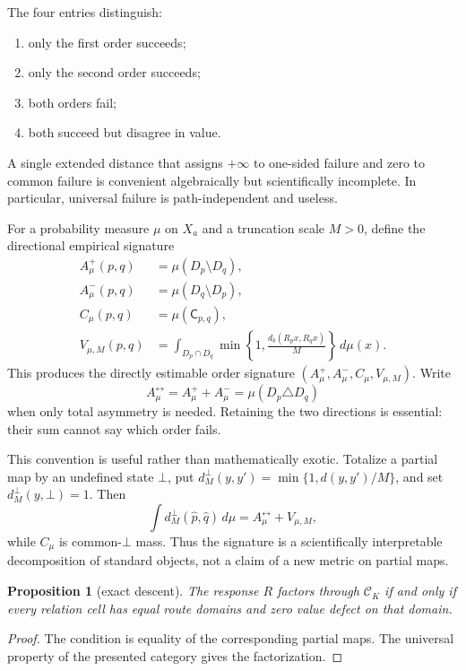 \documentclass[11pt]{article}
\newtheorem{proposition}[theorem]{Proposition}
\theoremstyle{definition}
\theoremstyle{remark}
\newcommand{\cK}{\mathcal{C}_K}
\newcommand{\cfail}{\mathsf{C}}
\begin{document}
The four entries distinguish:

\begin{enumerate}
  \item only the first order succeeds;
  \item only the second order succeeds;
  \item both orders fail;
  \item both succeed but disagree in value.
\end{enumerate}

A single extended distance that assigns \(+\infty\) to one-sided failure and
zero to common failure is convenient algebraically but scientifically
incomplete. In particular, universal failure is path-independent and useless.

For a probability measure \(\mu\) on \(X_a\) and a truncation scale \(M>0\),
define the directional empirical signature
\begin{align}
A_\mu^+(p,q)&=\mu(D_p\setminus D_q),\label{eq:asymplus}\\
A_\mu^-(p,q)&=\mu(D_q\setminus D_p),\label{eq:asymminus}\\
C_\mu(p,q)&=\mu(\cfail_{p,q}),\label{eq:common}\\
V_{\mu,M}(p,q)&=
\int_{D_p\cap D_q}
\min\left\{1,\frac{d_b(R_px,R_qx)}{M}\right\}\,d\mu(x).
\label{eq:value}
\end{align}
This produces the directly estimable order signature
\((A_\mu^+,A_\mu^-,C_\mu,V_{\mu,M})\). Write
\[
A_\mu^{\leftrightarrow}=A_\mu^++A_\mu^-
=\mu(D_p\triangle D_q)
\]
when only total asymmetry is needed. Retaining the two directions is
essential: their sum cannot say which order fails.

This convention is useful rather than mathematically exotic. Totalize a
partial map by an undefined state \(\bot\), put
\(d_M^\bot(y,y')=\min\{1,d(y,y')/M\}\), and set
\(d_M^\bot(y,\bot)=1\). Then
\[
\int d_M^\bot(\widehat p,\widehat q)\,d\mu
=A_\mu^{\leftrightarrow}+V_{\mu,M},
\]
while \(C_\mu\) is common-\(\bot\) mass. Thus the signature is a
scientifically interpretable decomposition of standard objects, not a claim
of a new metric on partial maps.

\begin{proposition}[exact descent]
\label{prop:descent}
The response \(R\) factors through \(\cK\) if and only if every relation cell
has equal route domains and zero value defect on that domain.
\end{proposition}

\begin{proof}
The condition is equality of the corresponding partial maps. The universal
property of the presented category gives the factorization.
\end{proof}
\end{document}
